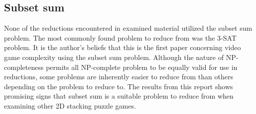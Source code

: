 \subsection{Subset sum}

None of the reductions encountered in examined material utilized the subset sum problem. The most commonly found problem to reduce from was the 3-SAT problem. It is the author's beliefs that this is the first paper concerning video game complexity using the subset sum problem. Although the nature of NP-completeness permits all NP-complete problem to be equally valid for use in reductions, some problems are inherently easier to reduce from than others depending on the problem to reduce to. The results from this report shows promising signs that subset sum is a suitable problem to reduce from when examining other 2D stacking puzzle games. 
